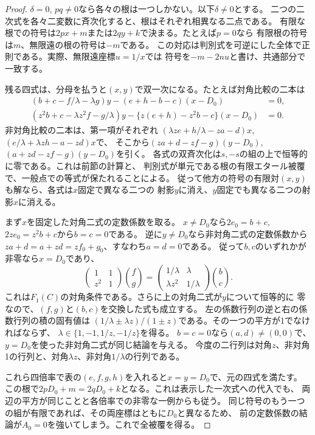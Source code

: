 \begin{proof}
$\delta=0$, $pq\ne0$なら各々の根は一つしかない。以下$\delta\ne0$とする。
二つの二次式を各々二変数に斉次化すると、根はそれぞれ相異なる二点である。
有限な根での符号は$2p x+m$または$2q y+k$で決まる。たとえば$p=0$なら
有限根の符号は$m$、無限遠の根の符号は$-m$である。
この対応は判別式を可逆にした全体で正則である。実際、無限遠座標$u=1/x$では
符号を$-m-2nu$と書け、共通部分で一致する。

残る四式は、分母を払うと$(x,y)$で双一次になる。たとえば対角比較の二本は
\[
\begin{split}
 (b+c-f/\lambda-\lambda g)y
   -(e+h-b-c)(x-D_0)&=0,\\
 (z^2b+c-\lambda z^2 f-g/\lambda)y
   -\{z(e+h)-z^2 b-c\}(x-D_0)&=0 .
\end{split}
\]
非対角比較の二本は、第一項がそれぞれ
$(\lambda ze+h/\lambda-za-d)x$, $(e/\lambda+\lambda zh-a-zd)x$で、
そこから$(za+d-zf-g)(y-D_0)$, $(a+zd-zf-g)(y-D_0)$を引く。
各式の双斉次化は$s,-s$の組の上で恒等的に零である。これは前節の計算と、
判別式が単元である根の有限エタール被覆で、一般点での等式が保たれることによる。
従って他方の符号の有限対$(x,y)$も解なら、各式は$x$固定で異なる二つの
射影$y$に消え、$y$固定でも異なる二つの射影$x$に消える。

まず$x$を固定した対角二式の定数係数を取る。
$x\ne D_0$なら$2e_0=b+c$, $2ze_0=z^2b+c$から$b=c=0$である。
逆に$y\ne D_0$なら非対角二式の定数係数から
$za+d=a+zd=zf_0+g_0$、すなわち$a=d=0$である。
従って$b,c$のいずれかが非零なら$x=D_0$であり、
\[
 \begin{pmatrix}1&1\\z^2&1\end{pmatrix}\binom fg
 =\begin{pmatrix}1/\lambda&\lambda\\\lambda z^2&1/\lambda\end{pmatrix}\binom bc .
\]
これは$F_1(C)$の対角条件である。さらに上の対角二式が$y$について恒等的に
零なので、$(f,g)$と$(b,c)$を交換した式も成立する。
左の係数行列の逆と右の係数行列の積の固有値は
$(1/\lambda\pm\lambda z)/(1\pm z)$である。その一つの平方が1でなければならず、
$\lambda\in\{1,-1,1/z,-1/z\}$を得る。
$b=c=0$なら$(a,d)\ne(0,0)$で、$y=D_0$を使った非対角二式が同じ結論を与える。
今度の二行列は対角$z$、非対角1の行列と、対角$\lambda z$、非対角$1/\lambda$の行列である。

これら四倍率で表の$(e,f,g,h)$を入れると$x=y=D_0$で、元の四式を満たす。
この根で$2pD_0+m=2qD_0+k$となる。これは表示した一次式への代入でも、
両辺の平方が同じことと各倍率での非零な一例からも従う。
同じ符号のもう一つの組が有限であれば、その両座標はともに$D_0$と異なるため、
前の定数係数の結論が$A_0=0$を強いてしまう。これで全被覆を得る。


\end{proof}
